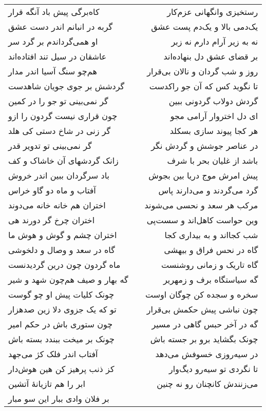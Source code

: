 \begin{center}
\begin{longtable}{l p{0.5cm} r}
کاه‌برگی پیش باد آنگه قرار
&&
رستخیزی وانگهانی عزم‌کار
\\
گربه در انبانم اندر دست عشق
&&
یک‌دمی بالا و یک‌دم پست عشق
\\
او همی‌گرداندم بر گرد سر
&&
نه به زیر آرام دارم نه زبر
\\
عاشقان در سیل تند افتاده‌اند
&&
بر قضای عشق دل بنهاده‌اند
\\
هم‌چو سنگ آسیا اندر مدار
&&
روز و شب گردان و نالان بی‌قرار
\\
گردشش بر جوی جویان شاهدست
&&
تا نگوید کس که آن جو راکدست
\\
گر نمی‌بینی تو جو را در کمین
&&
گردش دولاب گردونی ببین
\\
چون قراری نیست گردون را ازو
&&
ای دل اختروار آرامی مجو
\\
گر زنی در شاخ دستی کی هلد
&&
هر کجا پیوند سازی بسکلد
\\
گر نمی‌بینی تو تدویر قدر
&&
در عناصر جوشش و گردش نگر
\\
زانک گردشهای آن خاشاک و کف
&&
باشد از غلیان بحر با شرف
\\
باد سرگردان ببین اندر خروش
&&
پیش امرش موج دریا بین بجوش
\\
آفتاب و ماه دو گاو خراس
&&
گرد می‌گردند و می‌دارند پاس
\\
اختران هم خانه خانه می‌دوند
&&
مرکب هر سعد و نحسی می‌شوند
\\
اختران چرخ گر دورند هی
&&
وین حواست کاهل‌اند و سست‌پی
\\
اختران چشم و گوش و هوش ما
&&
شب کجااند و به بیداری کجا
\\
گاه در سعد و وصال و دلخوشی
&&
گاه در نحس فراق و بیهشی
\\
ماه گردون چون درین گردیدنست
&&
گاه تاریک و زمانی روشنست
\\
گه بهار و صیف هم‌چون شهد و شیر
&&
گه سیاستگاه برف و زمهریر
\\
چونک کلیات پیش او چو گوست
&&
سخره و سجده کن چوگان اوست
\\
تو که یک جزوی دلا زین صدهزار
&&
چون نباشی پیش حکمش بی‌قرار
\\
چون ستوری باش در حکم امیر
&&
گه در آخر حبس گاهی در مسیر
\\
چونک بر میخت ببندد بسته باش
&&
چونک بگشاید برو بر جسته باش
\\
آفتاب اندر فلک کژ می‌جهد
&&
در سیه‌روزی خسوفش می‌دهد
\\
کز ذنب پرهیز کن هین هوش‌دار
&&
تا نگردی تو سیه‌رو دیگ‌وار
\\
ابر را هم تازیانهٔ آتشین
&&
می‌زنندش کانچنان رو نه چنین
\\
بر فلان وادی ببار این سو مبار

\end{longtable}
\end{center}
